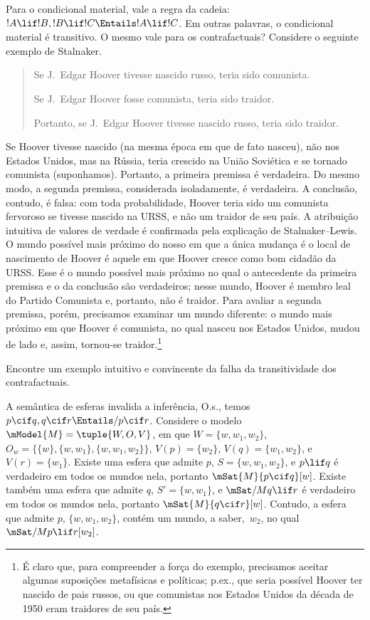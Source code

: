 \documentclass[../../../include/open-logic-section]{subfiles}
\begin{document}


Para o condicional material, vale a regra da cadeia: $!A \lif !B, !B
\lif !C \Entails !A \lif !C$. Em outras palavras, o condicional material
é transitivo. O mesmo vale para os contrafactuais? Considere o
seguinte exemplo de Stalnaker.
\begin{quote}
  Se J.~Edgar Hoover tivesse nascido russo, teria sido comunista.

  Se J.~Edgar Hoover fosse comunista, teria sido traidor.

  Portanto, se J.~Edgar Hoover tivesse nascido russo, teria
  sido traidor.
\end{quote}
Se Hoover tivesse nascido (na mesma época em que de fato nasceu), não nos
Estados Unidos, mas na Rússia, teria crescido na União Soviética
e se tornado comunista (suponhamos). Portanto, a primeira premissa é
verdadeira. Do mesmo modo, a segunda premissa, considerada isoladamente, é
verdadeira. A conclusão, contudo, é falsa: com toda probabilidade, Hoover
teria sido um comunista fervoroso se tivesse nascido na URSS,
e não um traidor de seu país. A atribuição intuitiva de
valores de verdade é confirmada pela explicação de Stalnaker--Lewis. O mundo
possível mais próximo do nosso em que a única mudança é o local de
nascimento de Hoover é aquele em que Hoover cresce como bom cidadão da
URSS. Esse é o mundo possível mais próximo no qual o antecedente da
primeira premissa e o da conclusão são verdadeiros; nesse mundo, Hoover
é membro leal do Partido Comunista e, portanto, não é traidor. Para
avaliar a segunda premissa, porém, precisamos examinar um mundo diferente:
o mundo mais próximo em que Hoover é comunista, no qual
nasceu nos Estados Unidos, mudou de lado e, assim, tornou-se
traidor.\footnote{É claro que, para compreender a força do exemplo,
  precisamos aceitar algumas suposições metafísicas e políticas;
  p.ex., que seria possível Hoover ter nascido de
  pais russos, ou que comunistas nos Estados Unidos da década de 1950 eram
  traidores de seu país.}

\begin{prob}
  Encontre um exemplo intuitivo e convincente da falha da transitividade
  dos contrafactuais.
\end{prob}

\begin{ex}
  A semântica de esferas invalida a inferência, O.s.\@, temos $p
  \cif q, q \cif r \Entails/ p \cif r$. Considere o modelo $\mModel{M}
  = \tuple{W, O, V}$, em que $W = \{w, w_1, w_2\}$, $O_w = \{\{w\}, \{w,
  w_1\}, \{w, w_1, w_2\}\}$, $V(p) = \{w_2\}$, $V(q) = \{w_1, w_2\}$,
  e $V(r) = \{w_1\}$. Existe uma esfera que admite $p$, $S = \{w, w_1,
  w_2\}$, e $p \lif q$ é verdadeiro em todos os mundos nela, portanto $\mSat{M}{p
    \cif q}[w]$. Existe também uma esfera que admite $q$, $S' = \{w,
  w_1\}$, e $\mSat/{M}{q \lif r}$ é verdadeiro em todos os mundos nela, portanto
  $\mSat{M}{q \cif r}[w]$. Contudo, a esfera que admite $p$, $\{w,
  w_1, w_2\}$, contém um mundo, a saber,~$w_2$, no qual $\mSat/{M}{p \lif
    r}[w_2]$.
\end{ex}
\end{document}
